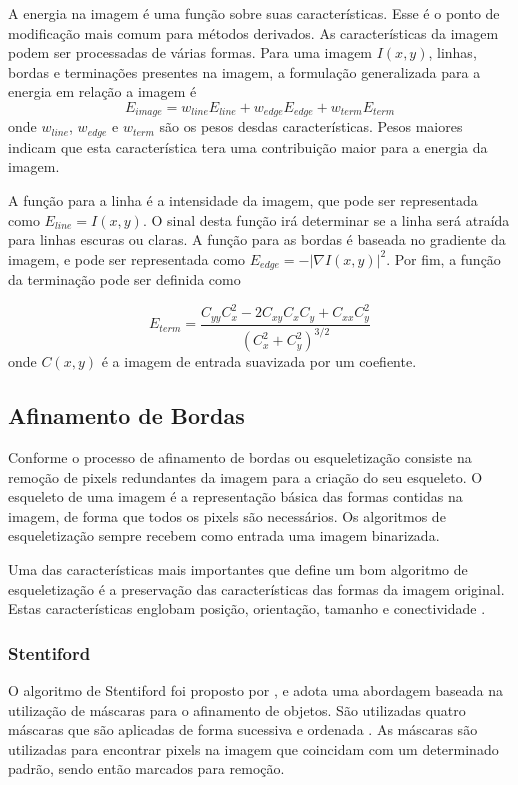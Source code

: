 \documentclass[12pt,oneside,a4paper,english,french,spanish,brazil,]{abntex2}
\begin{document}
A energia na imagem é uma função sobre suas características. Esse é o ponto de modificação mais comum para métodos derivados. As características da imagem podem ser processadas de várias formas. Para uma imagem \(I(x,y)\), linhas, bordas e terminações presentes na imagem, a formulação generalizada para a energia em relação a imagem é 
\[E_{image}=w_{line}E_{line}+w_{edge}E_{edge}+w_{term}E_{term}\]
onde \(w_{line}\), \(w_{edge}\) e \(w_{term}\) são os pesos desdas características. Pesos maiores indicam que esta característica tera uma contribuição maior para a energia da imagem.

A função para a linha é a intensidade da imagem, que pode ser representada como \(E_{{line}}=I(x,y)\). O sinal desta função irá determinar se a linha será atraída para linhas escuras ou claras. A função para as bordas é baseada no gradiente da imagem, e pode ser representada como \(E_{edge}=-\left|\nabla I(x,y)\right\vert ^{2}\). Por fim, a função da terminação pode ser definida como 

\[E_{term}=\frac{C_{yy}C_{x}^{2}-2C_{xy}C_{x}C_{y}+C_{xx}C_{y}^{2}}{(C_{x}^{2}+C_{y}^{2})^{3/2}}\] 
onde \(C(x,y)\) é a imagem de entrada suavizada por um coefiente.


\subsection{Afinamento de Bordas}

Conforme \citet{guilherme:2007} o processo de afinamento de bordas ou esqueletização consiste na remoção de pixels redundantes da imagem para a criação do seu esqueleto. O esqueleto de uma imagem é a representação básica das formas contidas na imagem, de forma que todos os pixels são necessários. Os algoritmos de esqueletização sempre recebem como entrada uma imagem binarizada.

Uma das características mais importantes que define um bom algoritmo de esqueletização é a preservação das características das formas da imagem original. Estas características englobam posição, orientação, tamanho e conectividade \cite{guilherme:2007}.

\subsubsection{Stentiford}

O algoritmo de Stentiford foi proposto por \citet{stentiford:1983}, e adota uma abordagem baseada na utilização de máscaras para o afinamento de objetos. São utilizadas quatro máscaras que são aplicadas de forma sucessiva e ordenada \cite{guilherme:2007}. As máscaras são utilizadas para encontrar pixels na imagem que coincidam com um determinado padrão, sendo então marcados para remoção.
\end{document}
